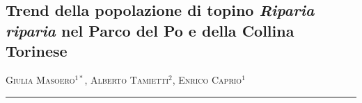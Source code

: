 \setcounter{figure}{0}
\setcounter{table}{0}

\begin{adjustwidth}{-3.5cm}{0cm}
\pagestyle{CIOpage}
\chapter*[Trend della popolazione di topino nel Parco del Po
torinese]{Trend della popolazione di topino \textbf{\textit{Riparia
riparia }}\textbf{nel Parco del Po e della Collina Torinese}}

\textsc{Giulia Masoero}$^{1*}$, \textsc{Alberto Tamietti}$^{2}$, 
\textsc{Enrico Caprio}$^{1}$\\

  
\noindent\color{MUSEBLUE}\rule{27cm}{2pt}
\vspace{1cm}
\end{adjustwidth}



